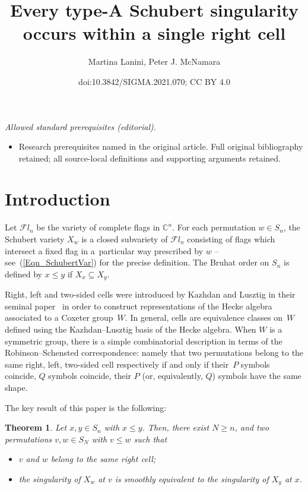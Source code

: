 \documentclass[10pt,a4paper]{amsart}
\title{Every type-A Schubert singularity occurs within a single right cell}
\author{Martina Lanini, Peter J. McNamara}
\date{doi:10.3842/SIGMA.2021.070; CC BY 4.0}
\numberwithin{equation}{section}
\newtheorem{Theorem}{Theorem}[section]
\newcommand{\C}{\mathbb{C}}
\begin{document}
\maketitle
\noindent\textit{Allowed standard prerequisites (editorial).}\begin{itemize}
\item Research prerequisites named in the original article. Full original bibliography retained; all source-local definitions and supporting arguments retained.
\end{itemize}\medskip
\section{Introduction}

Let $\mathcal{F}l_n$ be the variety of complete flags in $\C^n$. For each permutation $w\in S_n$, the Schubert variety $X_w$ is a closed subvariety of $\mathcal{F}l_n$ consisting of flags which intersect a fixed flag in a~particular way prescribed by $w$ -- see~(\ref{Eqn_SchubertVar}) for the precise definition. The Bruhat order on $S_n$ is defined by $x\leq y$ if $X_x\subseteq X_y$.

Right, left and two-sided cells were introduced by Kazhdan and Lusztig in their seminal paper~\cite{KL79} in order to construct representations of the Hecke algebra associated to a Coxeter group~$W$. In general, cells are equivalence classes on~$W$ defined using the Kazhdan--Lusztig basis of the Hecke algebra. When $W$ is a symmetric group, there is a simple combinatorial description in terms of the Robinson--Schensted correspondence: namely that two permutations belong to the same right, left, two-sided cell respectively if and only if their~$P$ symbols coincide, $Q$ symbols coincide, their $P$ (or, equivalently, $Q$) symbols have the same shape.

The key result of this paper is the following:

\begin{Theorem}\label{Thm_Main}Let $x,y\in S_n$ with $x\leq y$. Then, there exist $N\geq n$, and two permutations $v,w\in S_N$ with $v\leq w$ such that
\begin{itemize}\itemsep=0pt
\item $v$ and $w$ belong to the same right cell;
\item the singularity of $X_w$ at $v$ is smoothly equivalent to the singularity of $X_y$ at $x$.
\end{itemize}
\end{Theorem}
\end{document}
